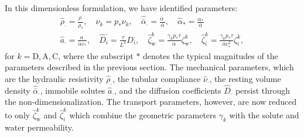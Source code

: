 \documentclass{article}
\begin{document}
In this dimensionless formulation, we have identified parameters:
\begin{gather}
    \hat{\rho}_\cdot = \frac{\rho_\cdot}{\rho_*},\quad 
    \hat{\nu}_k = p_*\nu_k,\quad \hat{\bar{\alpha}}_\cdot = \frac{\bar{\alpha}_\cdot}{\bar{\alpha}},\quad \hat{\alpha}_* = \frac{\alpha_*}{\bar{\alpha}}\\
    \hat{a}_\cdot = \frac{a_\cdot}{\bar{\alpha}c_*},\quad
    \hat{D}_i^\cdot = \frac{\tau}{L^2}D_i^\cdot,\quad 
    \hat{\zeta}_\mathrm{w}^k = \frac{\gamma_k p_*\tau}{\bar{\alpha}}\zeta_\mathrm{w}^k,\quad\hat{\zeta}_i^k = \frac{\gamma_kp_*\tau}{\bar{\alpha}c_*^2}\zeta_i^k,
\end{gather}
    for $k=\mathrm{D},\mathrm{A},\mathrm{C}$, where the subscript $*$ denotes the typical magnitudes of the parameters described in the previous section.
The mechanical parameters, which are the hydraulic resistivity $\hat{\rho}_\cdot$, the tubular compliance $\hat{\nu}_\cdot$, the resting volume density $\hat{\bar{\alpha}}_\cdot$, immobile solutes $\hat{a}_\cdot$, and the diffusion coefficients $\hat{D}_\cdot$ persist through the non-dimensionalization.
The transport parameters, however, are now reduced to only $\hat{\zeta}_\mathrm{w}^k$ and $\hat{\zeta}_i^k$ which combine the geometric parameters $\gamma_k$ with the solute and water permeability.

\end{document}
